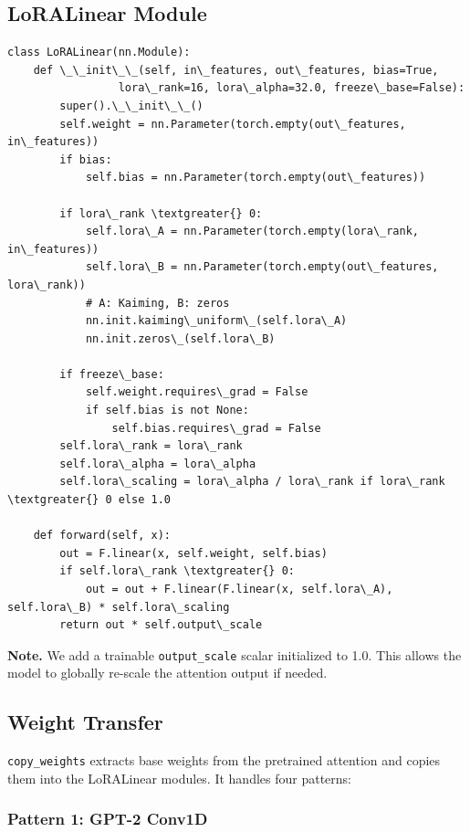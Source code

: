 \subsection{LoRALinear Module}

\begin{lstlisting}
class LoRALinear(nn.Module):
    def \_\_init\_\_(self, in\_features, out\_features, bias=True, 
                 lora\_rank=16, lora\_alpha=32.0, freeze\_base=False):
        super().\_\_init\_\_()
        self.weight = nn.Parameter(torch.empty(out\_features, in\_features))
        if bias:
            self.bias = nn.Parameter(torch.empty(out\_features))
        
        if lora\_rank \textgreater{} 0:
            self.lora\_A = nn.Parameter(torch.empty(lora\_rank, in\_features))
            self.lora\_B = nn.Parameter(torch.empty(out\_features, lora\_rank))
            # A: Kaiming, B: zeros
            nn.init.kaiming\_uniform\_(self.lora\_A)
            nn.init.zeros\_(self.lora\_B)
        
        if freeze\_base:
            self.weight.requires\_grad = False
            if self.bias is not None:
                self.bias.requires\_grad = False
        self.lora\_rank = lora\_rank
        self.lora\_alpha = lora\_alpha
        self.lora\_scaling = lora\_alpha / lora\_rank if lora\_rank \textgreater{} 0 else 1.0
    
    def forward(self, x):
        out = F.linear(x, self.weight, self.bias)
        if self.lora\_rank \textgreater{} 0:
            out = out + F.linear(F.linear(x, self.lora\_A), self.lora\_B) * self.lora\_scaling
        return out * self.output\_scale
\end{lstlisting}

\textbf{Note.} We add a trainable \texttt{output\_scale} scalar initialized to 1.0. This 
allows the model to globally re-scale the attention output if needed.

\subsection{Weight Transfer}

\texttt{copy\_weights} extracts base weights from the pretrained attention and 
copies them into the LoRALinear modules. It handles four patterns:

\subsubsection{Pattern 1: GPT-2 Conv1D}


